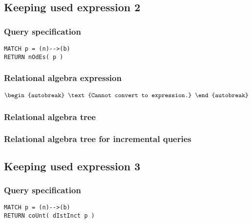 \subsection{Keeping used expression 2}

\subsubsection*{Query specification}

\begin{lstlisting}
MATCH p = (n)-->(b)
RETURN nOdEs( p )
\end{lstlisting}

\subsubsection*{Relational algebra expression}

\begin{align*}
\begin{autobreak}
\text{Cannot convert to expression.}
\end{autobreak}
\end{align*}

\subsubsection*{Relational algebra tree}


\subsubsection*{Relational algebra tree for incremental queries}


\subsection{Keeping used expression 3}

\subsubsection*{Query specification}

\begin{lstlisting}
MATCH p = (n)-->(b)
RETURN coUnt( dIstInct p )
\end{lstlisting}

